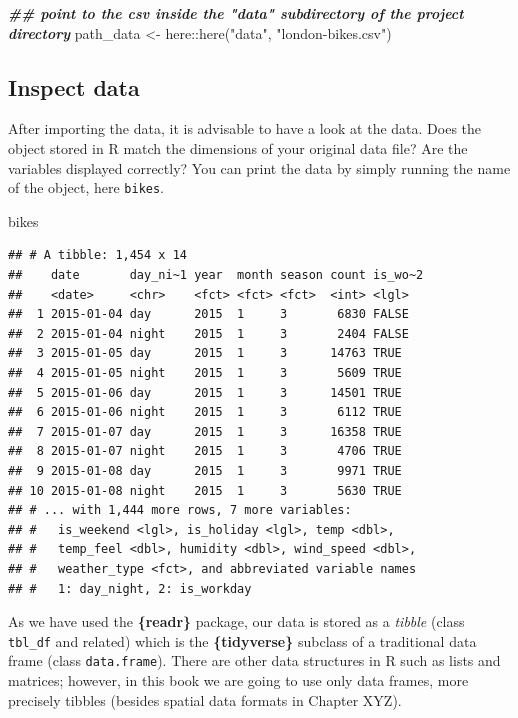 \documentclass[
]{krantz}
\makeatletter
\newenvironment{Shaded}{\begin{snugshade}}{\end{snugshade}}
\newcommand{\DocumentationTok}[1]{\textcolor[rgb]{0.37,0.37,0.37}{\textbf{\textit{#1}}}}
\newcommand{\FunctionTok}[1]{\textcolor[rgb]{0,0,0}{#1}}
\newcommand{\NormalTok}[1]{#1}
\newcommand{\OtherTok}[1]{\textcolor[rgb]{0.37,0.37,0.37}{#1}}
\newcommand{\SpecialCharTok}[1]{\textcolor[rgb]{0,0,0}{#1}}
\newcommand{\StringTok}[1]{\textcolor[rgb]{0.5,0.5,0.5}{#1}}
\newenvironment{kframe}{%
\medskip{}
\setlength{\fboxsep}{.8em}
 \def\at@end@of@kframe{}%
 \ifinner\ifhmode%
  \def\at@end@of@kframe{\end{minipage}}%
  \begin{minipage}{\columnwidth}%
 \fi\fi%
 \def\FrameCommand##1{\hskip\@totalleftmargin \hskip-\fboxsep
 \colorbox{shadecolor}{##1}\hskip-\fboxsep
     \hskip-\linewidth \hskip-\@totalleftmargin \hskip\columnwidth}%
 \MakeFramed {\advance\hsize-\width
   \@totalleftmargin\z@ \linewidth\hsize
   \@setminipage}}%
 {\par\unskip\endMakeFramed%
 \at@end@of@kframe}
\renewenvironment{Shaded}{\begin{kframe}}{\end{kframe}}
\makeatother
\begin{document}
\begin{Shaded}
\begin{Highlighting}[]
\DocumentationTok{\#\# point to the csv inside the "data" subdirectory of the project directory}
\NormalTok{path\_data }\OtherTok{\textless{}{-}}\NormalTok{ here}\SpecialCharTok{::}\FunctionTok{here}\NormalTok{(}\StringTok{"data"}\NormalTok{, }\StringTok{"london{-}bikes.csv"}\NormalTok{) }
\end{Highlighting}
\end{Shaded}

\hypertarget{inspect}{%
\subsection{Inspect data}\label{inspect}}

After importing the data, it is advisable to have a look at the data. Does the object stored in R match the dimensions of your original data file? Are the variables displayed correctly? You can print the data by simply running the name of the object, here \texttt{bikes}.

\begin{Shaded}
\begin{Highlighting}[]
\NormalTok{bikes}
\end{Highlighting}
\end{Shaded}

\begin{verbatim}
## # A tibble: 1,454 x 14
##    date       day_ni~1 year  month season count is_wo~2
##    <date>     <chr>    <fct> <fct> <fct>  <int> <lgl>  
##  1 2015-01-04 day      2015  1     3       6830 FALSE  
##  2 2015-01-04 night    2015  1     3       2404 FALSE  
##  3 2015-01-05 day      2015  1     3      14763 TRUE   
##  4 2015-01-05 night    2015  1     3       5609 TRUE   
##  5 2015-01-06 day      2015  1     3      14501 TRUE   
##  6 2015-01-06 night    2015  1     3       6112 TRUE   
##  7 2015-01-07 day      2015  1     3      16358 TRUE   
##  8 2015-01-07 night    2015  1     3       4706 TRUE   
##  9 2015-01-08 day      2015  1     3       9971 TRUE   
## 10 2015-01-08 night    2015  1     3       5630 TRUE   
## # ... with 1,444 more rows, 7 more variables:
## #   is_weekend <lgl>, is_holiday <lgl>, temp <dbl>,
## #   temp_feel <dbl>, humidity <dbl>, wind_speed <dbl>,
## #   weather_type <fct>, and abbreviated variable names
## #   1: day_night, 2: is_workday
\end{verbatim}

As we have used the \textbf{\{readr\}} package, our data is stored as a \emph{tibble} (class \texttt{tbl\_df} and related) which is the \textbf{\{tidyverse\}} subclass of a traditional data frame (class \texttt{data.frame}). There are other data structures in R such as lists and matrices; however, in this book we are going to use only data frames, more precisely tibbles (besides spatial data formats in Chapter XYZ).
\end{document}

